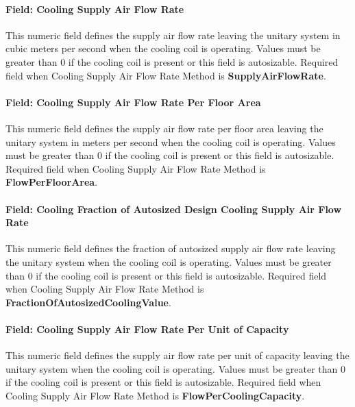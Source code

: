 \paragraph{Field: Cooling Supply Air Flow Rate}\label{field-cooling-supply-air-flow-rate-001}

This numeric field defines the supply air flow rate leaving the unitary system in cubic meters per second when the cooling coil is operating. Values must be greater than 0 if the cooling coil is present or this field is autosizable. Required field when Cooling Supply Air Flow Rate Method is \textbf{SupplyAirFlowRate}.

\paragraph{Field: Cooling Supply Air Flow Rate Per Floor Area}\label{field-cooling-supply-air-flow-rate-per-floor-area}

This numeric field defines the supply air flow rate per floor area leaving the unitary system in meters per second when the cooling coil is operating. Values must be greater than 0 if the cooling coil is present or this field is autosizable. Required field when Cooling Supply Air Flow Rate Method is \textbf{FlowPerFloorArea}.

\paragraph{Field: Cooling Fraction of Autosized Design Cooling Supply Air Flow Rate}\label{field-cooling-fraction-of-autosized-design-cooling-supply-air-flow-rate}

This numeric field defines the fraction of autosized supply air flow rate leaving the unitary system when the cooling coil is operating. Values must be greater than 0 if the cooling coil is present or this field is autosizable. Required field when Cooling Supply Air Flow Rate Method is \textbf{FractionOfAutosizedCoolingValue}.

\paragraph{Field: Cooling Supply Air Flow Rate Per Unit of Capacity}\label{field-cooling-supply-air-flow-rate-per-unit-of-capacity}

This numeric field defines the supply air flow rate per unit of capacity leaving the unitary system when the cooling coil is operating. Values must be greater than 0 if the cooling coil is present or this field is autosizable. Required field when Cooling Supply Air Flow Rate Method is \textbf{FlowPerCoolingCapacity}.

